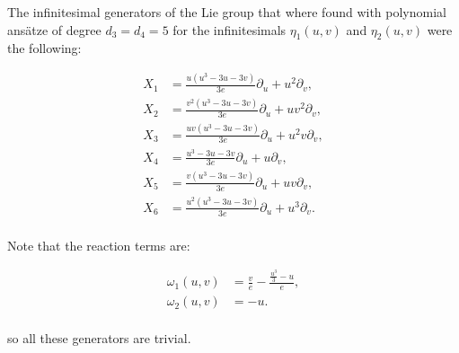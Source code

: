 The infinitesimal generators of the Lie group that where found with polynomial ans\"atze of degree $d_3=d_4=5$ for the infinitesimals $\eta_1(u,v)$ and $\eta_2(u,v)$ were the following:


\begin{align*}
X_{1}&=\frac{u \left(u^{3} - 3 u - 3 v\right)}{3 e}\partial_u+u^{2}\partial_v,\\
X_{2}&=\frac{v^{2} \left(u^{3} - 3 u - 3 v\right)}{3 e}\partial_u+u v^{2}\partial_v,\\
X_{3}&=\frac{u v \left(u^{3} - 3 u - 3 v\right)}{3 e}\partial_u+u^{2} v\partial_v,\\
X_{4}&=\frac{u^{3} - 3 u - 3 v}{3 e}\partial_u+u\partial_v,\\
X_{5}&=\frac{v \left(u^{3} - 3 u - 3 v\right)}{3 e}\partial_u+u v\partial_v,\\
X_{6}&=\frac{u^{2} \left(u^{3} - 3 u - 3 v\right)}{3 e}\partial_u+u^{3}\partial_v.\\
\end{align*}


Note that the reaction terms are:

\begin{align*}
\omega_1(u,v)&=\frac{v}{e} - \frac{\frac{u^{3}}{3} - u}{e},\\
\omega_2(u,v)&=- u.\\
\end{align*}


so all these generators are trivial.

